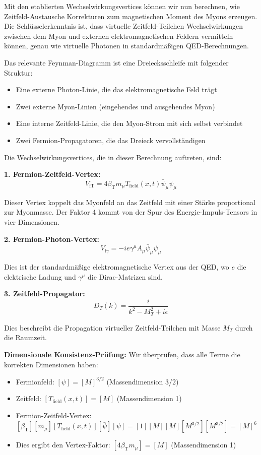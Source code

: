 \documentclass[12pt,a4paper]{article}
\newcommand{\Tfield}{T_{\text{field}}(x,t)}
\newcommand{\betaT}{\beta_{\text{T}}}
\begin{document}
	Mit den etablierten Wechselwirkungsvertices können wir nun berechnen, wie Zeitfeld-Austausche Korrekturen zum magnetischen Moment des Myons erzeugen. Die Schlüsselerkenntnis ist, dass virtuelle Zeitfeld-Teilchen Wechselwirkungen zwischen dem Myon und externen elektromagnetischen Feldern vermitteln können, genau wie virtuelle Photonen in standardmäßigen QED-Berechnungen.
	
	Das relevante Feynman-Diagramm ist eine Dreiecksschleife mit folgender Struktur:
	\begin{itemize}
		\item Eine externe Photon-Linie, die das elektromagnetische Feld trägt
		\item Zwei externe Myon-Linien (eingehendes und ausgehendes Myon)
		\item Eine interne Zeitfeld-Linie, die den Myon-Strom mit sich selbst verbindet
		\item Zwei Fermion-Propagatoren, die das Dreieck vervollständigen
	\end{itemize}
	
	Die Wechselwirkungsvertices, die in dieser Berechnung auftreten, sind:
	
	\textbf{1. Fermion-Zeitfeld-Vertex:}
	\begin{equation}
		V_{\text{fT}} = 4\betaT m_\mu \Tfield \bar{\psi}_\mu \psi_\mu
	\end{equation}
	
	Dieser Vertex koppelt das Myonfeld an das Zeitfeld mit einer Stärke proportional zur Myonmasse. Der Faktor 4 kommt von der Spur des Energie-Impuls-Tensors in vier Dimensionen.
	
	\textbf{2. Fermion-Photon-Vertex:}
	\begin{equation}
		V_{\text{f}\gamma} = -ie\gamma^\mu A_\mu \bar{\psi}_\mu \psi_\mu
	\end{equation}
	
	Dies ist der standardmäßige elektromagnetische Vertex aus der QED, wo $e$ die elektrische Ladung und $\gamma^\mu$ die Dirac-Matrizen sind.
	
	\textbf{3. Zeitfeld-Propagator:}
	\begin{equation}
		D_T(k) = \frac{i}{k^2 - M_T^2 + i\epsilon}
	\end{equation}
	
	Dies beschreibt die Propagation virtueller Zeitfeld-Teilchen mit Masse $M_T$ durch die Raumzeit.
	
	\textbf{Dimensionale Konsistenz-Prüfung:}
	Wir überprüfen, dass alle Terme die korrekten Dimensionen haben:
	\begin{itemize}
		\item Fermionfeld: $[\psi] = [M]^{3/2}$ (Massendimension 3/2)
		\item Zeitfeld: $[\Tfield] = [M]$ (Massendimension 1)
		\item Fermion-Zeitfeld-Vertex: $[\betaT][m_\mu][\Tfield][\bar{\psi}][\psi] = [1][M][M][M^{3/2}][M^{3/2}] = [M]^6$
		\item Dies ergibt den Vertex-Faktor: $[4\betaT m_\mu] = [M]$ (Massendimension 1)
	\end{itemize}
	
\end{document}
